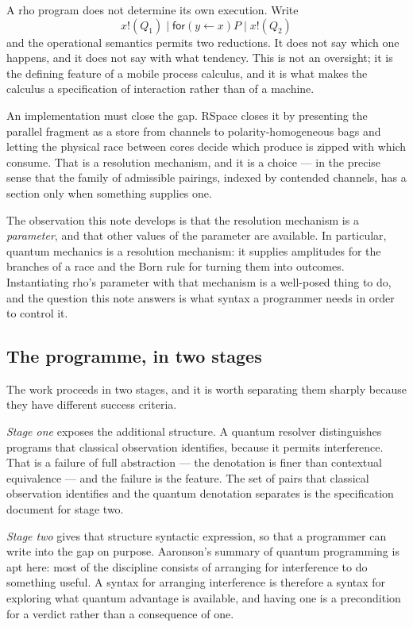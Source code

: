 \documentclass[11pt,a4paper]{article}
\theoremstyle{plain}
\theoremstyle{definition}
\theoremstyle{remark}
\begin{document}
A rho program does not determine its own execution. Write
\[
  x!(Q_1) \mid \textsf{for}(y \leftarrow x)P \mid x!(Q_2)
\]
and the operational semantics permits two reductions. It does not say which one
happens, and it does not say with what tendency. This is not an oversight; it is
the defining feature of a mobile process calculus, and it is what makes the
calculus a specification of interaction rather than of a machine.

An implementation must close the gap. RSpace closes it by presenting the parallel
fragment as a store from channels to polarity-homogeneous bags and letting the
physical race between cores decide which produce is zipped with which consume.
That is a resolution mechanism, and it is a choice --- in the precise sense that
the family of admissible pairings, indexed by contended channels, has a section
only when something supplies one.

The observation this note develops is that the resolution mechanism is a
\emph{parameter}, and that other values of the parameter are available. In
particular, quantum mechanics is a resolution mechanism: it supplies amplitudes
for the branches of a race and the Born rule for turning them into outcomes.
Instantiating rho's parameter with that mechanism is a well-posed thing to do,
and the question this note answers is what syntax a programmer needs in order to
control it.

\subsection{The programme, in two stages}

The work proceeds in two stages, and it is worth separating them sharply because
they have different success criteria.

\emph{Stage one} exposes the additional structure. A quantum resolver
distinguishes programs that classical observation identifies, because it permits
interference. That is a failure of full abstraction --- the denotation is finer
than contextual equivalence --- and the failure is the feature. The set of pairs
that classical observation identifies and the quantum denotation separates is
the specification document for stage two.

\emph{Stage two} gives that structure syntactic expression, so that a programmer
can write into the gap on purpose. Aaronson's summary of quantum programming is
apt here: most of the discipline consists of arranging for interference to do
something useful. A syntax for arranging interference is therefore a syntax for
exploring what quantum advantage is available, and having one is a precondition
for a verdict rather than a consequence of one.
\end{document}

